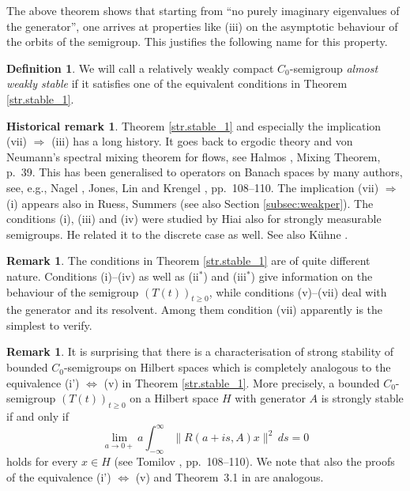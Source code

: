 \documentclass[11pt,intlimits, draft,oneside]{amsart}
\theoremstyle{definition}
\newtheorem{defi}[thm]{Definition}
\newtheorem{remark}[thm]{Remark}
\newtheorem{history-remark}[thm]{Historical remark}
\def\dd{\,d}
\begin{document}
The above theorem shows that starting from ``no purely imaginary eigenvalues of the ge\-ne\-rator'', one arrives at properties like (iii) on the asymptotic behaviour of the orbits of the semigroup. This justifies the following name for this property. 
%
\begin{defi}
We will call a relatively weakly compact $C_0$-semigroup \emph{almost weakly stable} if it satisfies one of the equivalent conditions in Theorem \ref{str.stable_1}. 
\end{defi}
%
%
\begin{history-remark}
Theorem \ref{str.stable_1} and especially the implication (vii)
$\Rightarrow$ (iii) has a long history. It goes back to ergodic
theory and von Neumann's spectral mixing theorem for flows, see
Halmos \cite{halmos:1956}, Mixing Theorem, p.~39. This has been
generalised to operators on Banach spaces by many authors, see,
e.g.,  Nagel \cite{nagel:1974}, Jones, Lin \cite{jones/lin:1976, jones/lin:1980} and Krengel
\cite{krengel:1985}, pp.~108--110. The
implication (vii) $\Rightarrow$ (i) appears also in Ruess, Summers
\cite{ruess/summers:1992jmaa} (see also Section
\ref{subsec:weakper}). The conditions (i), (iii) and (iv) were
studied by Hiai \cite{hiai:1978} also for strongly measurable
semigroups. He related it to the discrete case as well. See also
K\"uhne \cite{kuehne:1981, kuehne:1987}.
\end{history-remark}

\begin{remark}
The conditions in Theorem \ref{str.stable_1} are of quite different
nature. Conditions (i)--(iv) as well as (ii$^*$) and (iii$^*$) give
information on the behaviour of the semigroup $(T(t))_{t \geq 0}$,
while conditions (v)--(vii) deal with the generator and its
resolvent. Among them condition (vii) apparently is the simplest to
verify.
\end{remark}
\begin{remark}\label{rem:strongfulint}
It is surprising that there is a characterisation of strong
stability of bounded $C_0$-semigroups on Hilbert spaces which is
completely analogous to the equivalence (i') $\Leftrightarrow$ (v)
in Theorem \ref{str.stable_1}. More precisely, a bounded
$C_0$-semigroup $(T(t))_{t \geq 0}$ on a Hilbert space $H$ with
generator $A$ is strongly stable if and only if
\begin{equation*} \lim_{a \to 0+} a \int_{-\infty}^\infty \|R(a+i s,A)x\|^2 \dd s = 0\end{equation*}
holds for every $x \in H$ (see Tomilov \cite{tomilov:2001},
pp.~108--110).
  We note that also the proofs of the equivalence (i') $\Leftrightarrow$ (v) and
Theorem~3.1 in \cite{tomilov:2001} are analogous.
\end{remark}
\end{document}
